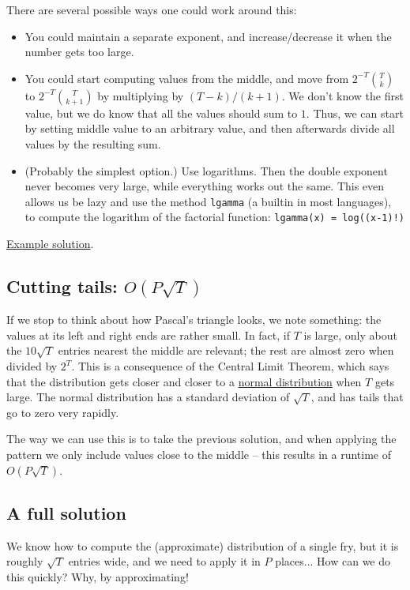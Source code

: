 \documentclass{article}
\begin{document}
There are several possible ways one could work around this:

\begin{itemize}
  \item You could maintain a separate exponent, and increase/decrease it when the number gets too large.
  \item You could start computing values from the middle, and move from $2^{-T}\binom{T}{k}$ to $2^{-T}\binom{T}{k+1}$
    by multiplying by $(T-k)/(k+1)$. We don't know the first value, but we do know that all the values should sum to $1$.
    Thus, we can start by setting middle value to an arbitrary value, and then afterwards divide all values by the resulting sum.
  \item (Probably the simplest option.) Use logarithms.
    Then the double exponent never becomes very large, while everything works out the same.
    This even allows us be lazy and use the method \texttt{lgamma} (a builtin in most languages),
    to compute the logarithm of the factorial function: \texttt{lgamma(x) = log((x-1)!)}
\end{itemize}

\href{https://github.com/nordicolympiad/nordic-olympiad-2018/blob/master/tasks/fries/submissions/precompute_sl.cpp}{Example solution}.

\subsection*{Cutting tails: $O(P\sqrt T)$}
If we stop to think about how Pascal's triangle looks, we note something: the values at its left and right ends are rather small.
In fact, if $T$ is large, only about the $10 \sqrt T$ entries nearest the middle are relevant; the rest are almost zero when divided by $2^T$.
This is a consequence of the Central Limit Theorem, which says that the distribution gets closer and closer to a \href{https://en.wikipedia.org/wiki/Normal_distribution}{normal distribution} when $T$ gets large.
The normal distribution has a standard deviation of $\sqrt T$, and has tails that go to zero very rapidly.

The way we can use this is to take the previous solution, and when applying the pattern we only include values close to the middle -- this results in a runtime of $O(P\sqrt T)$.

\subsection*{A full solution}
We know how to compute the (approximate) distribution of a single fry,
but it is roughly $\sqrt T$ entries wide, and we need to apply it in $P$ places...
How can we do this quickly? Why, by approximating!
\end{document}
